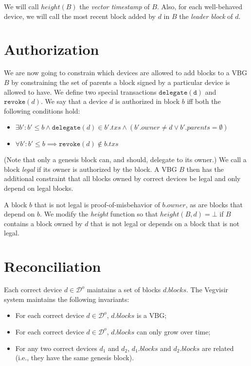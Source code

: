 \documentclass{article}
\begin{document}
We will call $\mathit{height}(B)$ the \emph{vector timestamp} of $B$.
Also, for each well-behaved device, we will call the most recent block added by $d$ in $B$ the
\emph{leader block} of $d$.

\section*{Authorization}

We are now going to constrain which devices are allowed to add blocks to a VBG $B$ by constraining
the set of parents a block signed by a particular device is allowed to have.
We define two special transactions $\mathtt{delegate(d)}$ and $\mathtt{revoke}(d)$.
We say that a device $d$ is authorized in block $b$ iff both the following
conditions hold:
\begin{itemize}
\item $\exists b': b' \leq b \wedge \mathtt{delegate}(d) \in b'.\mathit{txs} \wedge (b'.\mathit{owner} \ne d \vee b'.\mathit{parents} = \emptyset)$
\item $\forall b': b' \leq b \implies \mathtt{revoke}(d) \notin b.\mathit{txs}$
\end{itemize}
(Note that only a genesis block can, and should, delegate to its owner.)
We call a block \emph{legal} if its owner is authorized by the block.
A VBG $B$ then has the additional constraint that all blocks owned by correct devices be legal and
only depend on legal blocks.

A block $b$ that is not legal is proof-of-misbehavior of $b.\mathit{owner}$,
as are blocks that depend on $b$.
We modify the \textit{height} function so
that $\mathit{height}(B, d) = \bot$ if $B$ contains a block owned by $d$ that is not legal
or depends on a block that is not legal.

\section*{Reconciliation}

Each correct device $d \in \mathcal{D}^o$ maintains a set of blocks $d.\mathit{blocks}$.
The Vegvisir system maintains the following invariants:

\begin{itemize}
\item For each correct device $d \in \mathcal{D}^o$, $d.\mathit{blocks}$ is a VBG;
\item For each correct device $d \in \mathcal{D}^o$, $d.\mathit{blocks}$ can only grow over time;
\item For any two correct devices $d_1$ and $d_2$, $d_1.\mathit{blocks}$ and $d_2.\mathit{blocks}$ are related (i.e., they have the same genesis block).
\end{itemize}
\end{document}
